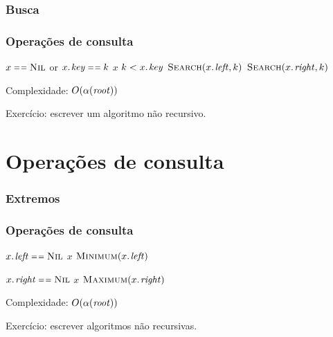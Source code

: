 \documentclass{beamer}
\begin{document}
\begin{frame}

\frametitle{Busca}
\frametitle{Operações de consulta}

\begin{codebox}
  \zi {}
  \li \If $x \isequal \const{Nil}$ or $\attrib{x}{key} \isequal k$
  \li \Then \Return $x$
  \li \Else 
  \li   \If $k < \attrib{x}{key}$
  \li   \Then \Return $\proc{Search}(\attrib{x}{left}, k)$
  \li   \Else \Return $\proc{Search}(\attrib{x}{right}, k)$
        \End
      \End
  \zi {}
  \zi {}
\end{codebox}

Complexidade: $O(\alpha(\id{root}))$
\pause

Exercício: escrever um algoritmo não recursivo.

\end{frame}

\section{Operações de consulta}

\begin{frame}

\frametitle{Extremos}
\frametitle{Operações de consulta}

\begin{codebox}
  \zi {}
  \li \If $\attrib{x}{left} \isequal \const{Nil}$
  \li \Then \Return $x$
  \li \Else \Return $\proc{Minimum}(\attrib{x}{left})$
      \End
  \zi {}
\end{codebox}

\begin{codebox}
  \zi {}
  \li \If $\attrib{x}{right} \isequal \const{Nil}$
  \li \Then \Return $x$
  \li \Else \Return $\proc{Maximum}(\attrib{x}{right})$
      \End
  \zi {}
\end{codebox}

Complexidade: $O(\alpha(\id{root}))$
\pause

Exercício: escrever algoritmos não recursivas.

\end{frame}
\end{document}
